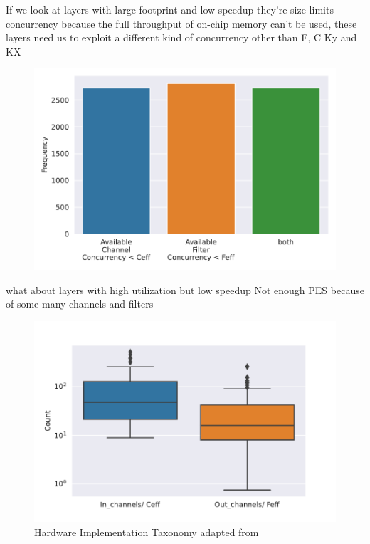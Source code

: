 If we look at layers with large footprint and low speedup they're size limits
concurrency because the full throughput of on-chip memory can't be used, these
layers need us to exploit a different kind of concurrency other than F, C Ky and
KX

\begin{figure}[ht]
    \centering
    \includegraphics[scale=0.58]{Plots/utilization/low_util_big_fmap.pdf}
    \label{fig:hw_taxonomy}
\end{figure}

what about layers with high utilization but low speedup
Not enough PES because of some many channels and filters

\begin{figure}[ht]
    \centering
    \includegraphics[scale=0.58]{Plots/utilization/ratios.pdf}
    \caption{Hardware Implementation Taxonomy adapted from \cite{maestro}}
    \label{fig:hw_taxonomy}
\end{figure}

